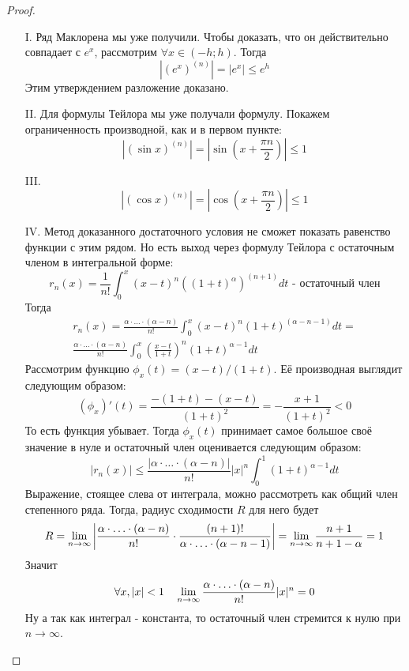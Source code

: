 \begin{proof}~
	\begin{enumerate}
		\item[I.] Ряд Маклорена мы уже получили. Чтобы доказать, что он действительно совпадает с $e^x$, рассмотрим $\forall x \in (-h; h)$. Тогда
		\[
			|(e^x)^{(n)}| = |e^x| \le e^h
		\]
		Этим утверждением разложение доказано.
		
		\item[II.] Для формулы Тейлора мы уже получали формулу. Покажем ограниченность производной, как и в первом пункте:
		\[
			|(\sin x)^{(n)}| = \left|\sin\left(x + \frac{\pi n}{2}\right)\right| \le 1
		\]
		
		\item[III.]
		\[
			|(\cos x)^{(n)}| = \left|\cos\left(x + \frac{\pi n}{2}\right)\right| \le 1
		\]
		
		\item[IV.] Метод доказанного достаточного условия не сможет показать равенство функции с этим рядом. Но есть выход через формулу Тейлора с остаточным членом в интегральной форме:
		\[
			r_n(x) = \frac{1}{n!} \int_0^x (x - t)^n \left((1 + t)^\alpha\right)^{(n + 1)}dt \text{ - остаточный член}
		\]
		Тогда
		\begin{multline*}
			r_n(x) = \frac{\alpha \cdot \ldots \cdot (\alpha - n)}{n!} \int_0^x (x - t)^n (1 + t)^{(\alpha - n - 1)}dt =
			\\
			\frac{\alpha \cdot \ldots \cdot (\alpha - n)}{n!} \int_0^x \left(\frac{x - t}{1 + t}\right)^n (1 + t)^{\alpha - 1}dt
		\end{multline*}
		Рассмотрим функцию $\phi_x(t) = (x - t) / (1 + t)$. Её производная выглядит следующим образом:
		\[
			(\phi_x)'(t) = \frac{-(1 + t) - (x - t)}{(1 + t)^2} = -\frac{x + 1}{(1 + t)^2} < 0
		\]
		То есть функция убывает. Тогда $\phi_x(t)$ принимает самое большое своё значение в нуле и остаточный член оценивается следующим образом:
		\[
			|r_n(x)| \le \frac{|\alpha \cdot \ldots \cdot (\alpha - n)|}{n!}|x|^n \int_0^1 (1 + t)^{\alpha - 1}dt
		\]
		Выражение, стоящее слева от интеграла, можно рассмотреть как общий член степенного ряда. Тогда, радиус сходимости $R$ для него будет
		\[
			R = \lim\limits_{n \to \infty} \left|\frac{\alpha \cdot \ldots \cdot (\alpha - n)}{n!} \cdot \frac{(n + 1)!}{\alpha \cdot \ldots \cdot (\alpha - n - 1)}\right| = \lim\limits_{n \to \infty} \frac{n + 1}{n + 1 - \alpha} = 1
		\]
		Значит
		\[
			\forall x, |x| < 1 \quad \lim\limits_{n \to \infty} \frac{\alpha \cdot \ldots \cdot (\alpha - n)}{n!}|x|^n = 0
		\]
		Ну а так как интеграл - константа, то остаточный член стремится к нулю при $n \to \infty$.
		

\end{enumerate}
\end{proof}
